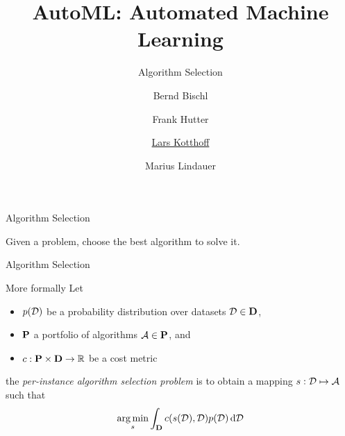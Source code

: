 




\title[AutoML: Overview]{AutoML: Automated Machine Learning}
\subtitle{Algorithm Selection}
\author[Lars Kotthoff]{Bernd Bischl \and Frank Hutter \and \underline{Lars Kotthoff} \and Marius Lindauer}
\institute{}
\date{}





	
	\maketitle
	


\begin{frame}[c]{Algorithm Selection}
    \begin{center}
        \Large{Given a problem, choose the best algorithm to solve it.}
    \end{center}
\end{frame}

\begin{frame}[c]{Algorithm Selection}
\begin{block}{More formally}
        Let 
        \begin{itemize}
                \item $p(\mathcal{D})$ be a probability distribution over datasets $\mathcal{D} \in \mathbf{D}$,
                \item $\mathbf{P}$ a portfolio of algorithms $\mathcal{A} \in \mathbf{P}$, and
                \item $c: \mathbf{P} \times \mathbf{D} \rightarrow \mathbb{R}$ be a cost metric   
        \end{itemize}
        
        the \emph{per-instance algorithm selection problem} is to obtain a mapping 
        $s: \mathcal{D} \mapsto \mathcal{A}$ 
        such that
        $$\operatorname*{arg\,min}_{s} \int_{\mathbf{D}} c(s(\mathcal{D}),\mathcal{D}) p(\mathcal{D}) \mathop{}\!\mathrm{d}\mathcal{D}$$
\end{block}

\end{frame}

